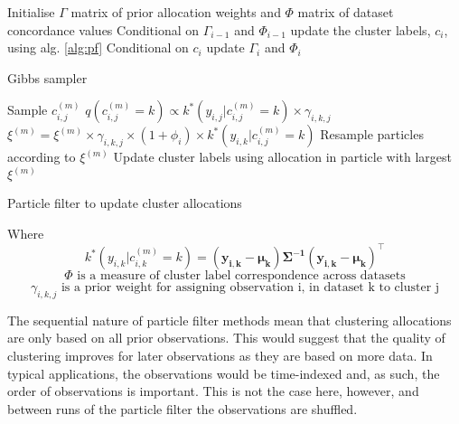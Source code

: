 \documentclass[10pt,a4paper]{report}
\begin{document}
\begin{algorithm}
 \begin{algorithmic}[1]
  \State Initialise $\Gamma$ matrix of prior allocation weights and $\Phi$ matrix of dataset concordance values
  \State Conditional on $\Gamma_{i-1}$ and $\Phi_{i-1}$ update the cluster labels, $c_{i}$, using alg. \ref{alg:pf}
  \State Conditional on $c_{i}$ update $\Gamma_i$ and $\Phi_i$
  \EndFor
\end{algorithmic}
\caption{Gibbs sampler}
\label{alg:gibbs}
\end{algorithm}


\begin{algorithm}

 \begin{algorithmic}[1]
   
   
   
  \State Sample $c^{(m)}_{i, j}$ 
  \State $q(c^{(m)}_{i,j} = k) \propto k^*(y_{i,j}|c_{i,j}^{(m)} = k) \times \gamma_{i, k, j}$ 
  \State $\xi^{(m)} =  \xi^{(m)} \times \gamma_{i, k, j} \times (1+\phi_{i}) \times k^*(y_{i,k}|c_{i,j}^{(m)} = k)$ 
  \EndFor
  \EndFor
  \State Resample particles according to $\xi^{(m)}$
  \EndFor
  \State Update cluster labels using allocation in particle with largest $\xi^{(m)}$

\end{algorithmic}
\caption{Particle filter to update cluster allocations}
\label{alg:pf}
\end{algorithm}

Where
\begin{equation}
\label{eq:likelihood}
k^*(y_{i, k}|c_{i, k}^{(m)} = k) = (\mathbf{y_{i, k}} - \mathbf{\mu_k}) \mathbf{\Sigma^{-1}} (\mathbf{y_{i, k}} - \mathbf{\mu_k})^\top
\end{equation}
\begin{equation}
\label{eq:phi}
\Phi \text{ is a measure of cluster label correspondence across datasets}
\end{equation}
\begin{equation}
\label{eq:gamma}
\gamma_{i, k, j} \text{ is a prior weight for assigning observation i, in dataset k to cluster j}
\end{equation}


The sequential nature of particle filter methods mean that clustering allocations are only based on all prior observations. This would suggest that the quality of clustering improves for later observations as they are based on more data. In typical applications, the observations would be time-indexed and, as such, the order of observations is important. This is not the case here, however, and between runs of the particle filter the observations are shuffled.
\end{document}
